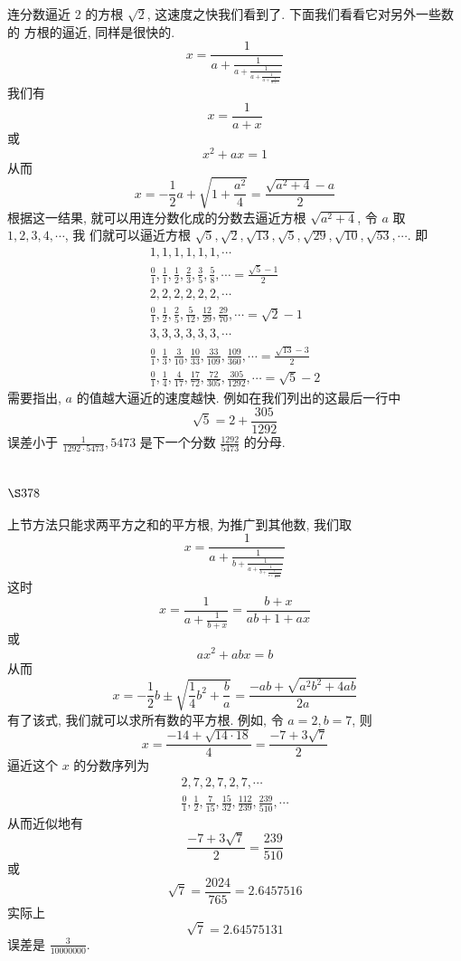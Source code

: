 连分数逼近 2 的方根 $\sqrt{2}$, 这速度之快我们看到了. 下面我们看看它对另外一些数的 方根的逼近, 同样是很快的.
\[
x=\frac{1}{a+\frac{1}{a+\frac{1}{a+\frac{1}{a+\frac{1}{a+\cdots}}}}}
\]
我们有
\[
x=\frac{1}{a+x}
\]
或
\[
x^{2}+a x=1
\]
从而
\[
x=-\frac{1}{2} a+\sqrt{1+\frac{a^{2}}{4}}=\frac{\sqrt{a^{2}+4}-a}{2}
\]
根据这一结果, 就可以用连分数化成的分数去逼近方根 $\sqrt{a^{2}+4}$, 令 $a$ 取 $1,2,3,4, \cdots$, 我 们就可以逼近方根 $\sqrt{5}, \sqrt{2}, \sqrt{13}, \sqrt{5}, \sqrt{29}, \sqrt{10}, \sqrt{53}, \cdots$. 即
\[
\begin{gathered}
1,1,1,1,1,1, \cdots \\
\frac{0}{1}, \frac{1}{1}, \frac{1}{2}, \frac{2}{3}, \frac{3}{5}, \frac{5}{8}, \cdots=\frac{\sqrt{5}-1}{2} \\
2,2,2,2,2,2, \cdots \\
\frac{0}{1}, \frac{1}{2}, \frac{2}{5}, \frac{5}{12}, \frac{12}{29}, \frac{29}{70}, \cdots=\sqrt{2}-1 \\
3,3,3,3,3,3, \cdots \\
\frac{0}{1}, \frac{1}{3}, \frac{3}{10}, \frac{10}{33}, \frac{33}{109}, \frac{109}{360}, \cdots=\frac{\sqrt{13}-3}{2} \\
\frac{0}{1}, \frac{1}{4}, \frac{4}{17}, \frac{17}{72}, \frac{72}{305}, \frac{305}{1292}, \cdots=\sqrt{5}-2
\end{gathered}
\]
需要指出, $a$ 的值越大逼近的速度越快. 例如在我们列出的这最后一行中
\[
\sqrt{5}=2+\frac{305}{1292}
\]
误差小于 $\frac{1}{1292 \cdot 5473}, 5473$ 是下一个分数 $\frac{1292}{5473}$ 的分母.

\section{$\S 378$}

上节方法只能求两平方之和的平方根, 为推广到其他数, 我们取
\[
x=\frac{1}{a+\frac{1}{b+\frac{1}{a+\frac{1}{b+\frac{1}{a+\frac{1}{b+\cdots}}}}}}
\]
这时
\[
x=\frac{1}{a+\frac{1}{b+x}}=\frac{b+x}{a b+1+a x}
\]
或
\[
a x^{2}+a b x=b
\]
从而
\[
x=-\frac{1}{2} b \pm \sqrt{\frac{1}{4} b^{2}+\frac{b}{a}}=\frac{-a b+\sqrt{a^{2} b^{2}+4 a b}}{2 a}
\]
有了该式, 我们就可以求所有数的平方根. 例如, 令 $a=2, b=7$, 则
\[
x=\frac{-14+\sqrt{14 \cdot 18}}{4}=\frac{-7+3 \sqrt{7}}{2}
\]
逼近这个 $x$ 的分数序列为
\[
\begin{gathered}
2,7,2,7,2,7, \cdots \\
\frac{0}{1}, \frac{1}{2}, \frac{7}{15}, \frac{15}{32}, \frac{112}{239}, \frac{239}{510}, \cdots
\end{gathered}
\]
从而近似地有
\[
\frac{-7+3 \sqrt{7}}{2}=\frac{239}{510}
\]
或
\[
\sqrt{7}=\frac{2024}{765}=2.6457516
\]
实际上
\[
\sqrt{7}=2.64575131
\]
误差是 $\frac{3}{10000000}$.

